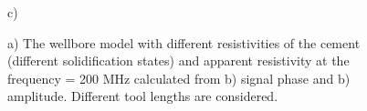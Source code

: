 \documentclass[10pt,twoside]{article}
\begin{document}
\begin{figure}[ht!]
\begin{minipage}[h]{0.34\linewidth}
 c) \\
\end{minipage}
\hfill
\caption{a) The wellbore model with different resistivities of the cement (different solidification states) and apparent resistivity at the frequency = 200 MHz calculated from b) signal phase and b) amplitude. Different tool lengths are considered. }
\label{logging_cement_solid_app}
\end{figure}
\end{document}
